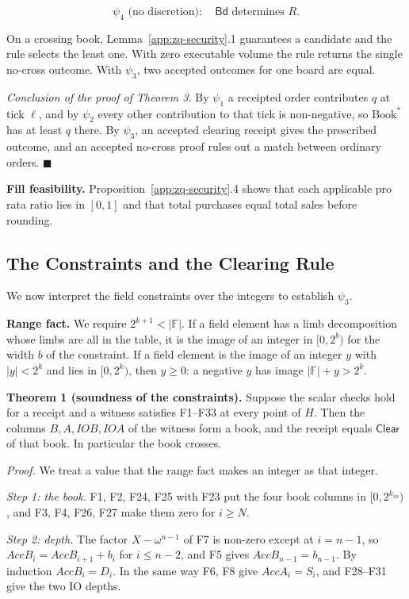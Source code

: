 \[\psi_4 \text{ (no discretion)}:\quad \mathsf{Bd} \text{ determines } R.\]

On a crossing book, Lemma~\ref{app:zq-security}.1 guarantees a candidate and the rule selects the least one. With zero executable volume the rule returns the single no-cross outcome. With \(\psi_3\), two accepted outcomes for one board are equal.

\emph{Conclusion of the proof of Theorem 3.} By \(\psi_1\) a receipted order contributes \(q\) at tick \(\ell\), and by \(\psi_2\) every other contribution to that tick is non-negative, so \(\text{Book}^*\) has at least \(q\) there. By \(\psi_3\), an accepted clearing receipt gives the prescribed outcome, and an accepted no-cross proof rules out a match between ordinary orders. \(\blacksquare\)

\textbf{Fill feasibility.} Proposition~\ref{app:zq-security}.4 shows that each applicable pro rata ratio lies in \([0,1]\) and that total purchases equal total sales before rounding.

\subsection{The Constraints and the Clearing Rule}
\label{app:zq-constraint-proof}

We now interpret the field constraints over the integers to establish \(\psi_3\).

\textbf{Range fact.} We require \(2^{k+1} < |\mathbb{F}|\). If a field element has a limb decomposition whose limbs are all in the table, it is the image of an integer in \([0, 2^b)\) for the width \(b\) of the constraint. If a field element is the image of an integer \(y\) with \(|y| < 2^k\) and lies in \([0, 2^k)\), then \(y \ge 0\): a negative \(y\) has image \(|\mathbb{F}| + y > 2^k\).

\textbf{Theorem 1 (soundness of the constraints).} Suppose the scalar checks hold for a receipt and a witness satisfies F1--F33 at every point of \(H\). Then the columns \(B, A, IOB, IOA\) of the witness form a book, and the receipt equals \(\mathsf{Clear}\) of that book. In particular the book crosses.

\emph{Proof.} We treat a value that the range fact makes an integer as that integer.

\emph{Step 1: the book.} F1, F2, F24, F25 with F23 put the four book columns in \([0, 2^{k_{in}})\), and F3, F4, F26, F27 make them zero for \(i \ge N\).

\emph{Step 2: depth.} The factor \(X - \omega^{n-1}\) of F7 is non-zero except at \(i = n-1\), so \(AccB_i = AccB_{i+1} + b_i\) for \(i \le n-2\), and F5 gives \(AccB_{n-1} = b_{n-1}\). By induction \(AccB_i = D_i\). In the same way F6, F8 give \(AccA_i = S_i\), and F28--F31 give the two IO depths.

